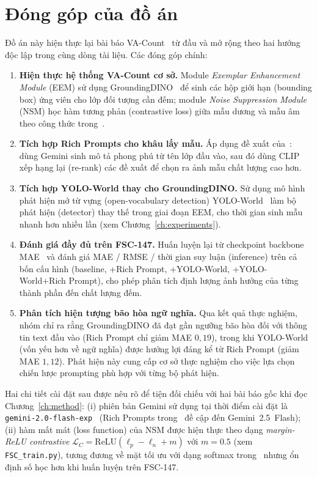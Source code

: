 \documentclass[a4paper,12pt]{report}
\numberwithin{figure}{chapter}
\numberwithin{table}{chapter}
\begin{document}
\section{Đóng góp của đồ án}
Đồ án này hiện thực lại bài báo VA-Count~\cite{vacount} từ đầu và mở rộng theo hai hướng độc lập trong cùng dòng tài liệu. Các đóng góp chính:

\begin{enumerate}
    \item \textbf{Hiện thực hệ thống VA-Count cơ sở.} Module \emph{Exemplar Enhancement Module} (EEM) sử dụng GroundingDINO~\cite{groundingdino} để sinh các hộp giới hạn (bounding box) ứng viên cho lớp đối tượng cần đếm; module \emph{Noise Suppression Module} (NSM) học hàm tương phản (contrastive loss) giữa mẫu dương và mẫu âm theo công thức trong~\cite{vacount}.
    \item \textbf{Tích hợp Rich Prompts cho khâu lấy mẫu.} Áp dụng đề xuất của~\cite{richprompts}: dùng Gemini sinh mô tả phong phú từ tên lớp đầu vào, sau đó dùng CLIP~\cite{clip} xếp hạng lại (re-rank) các đề xuất để chọn ra ảnh mẫu chất lượng cao hơn.
    \item \textbf{Tích hợp YOLO-World thay cho GroundingDINO.} Sử dụng mô hình phát hiện mở từ vựng (open-vocabulary detection) YOLO-World~\cite{yoloworld} làm bộ phát hiện (detector) thay thế trong giai đoạn EEM, cho thời gian sinh mẫu nhanh hơn nhiều lần (xem Chương~\ref{ch:experiments}).
    \item \textbf{Đánh giá đầy đủ trên FSC-147.} Huấn luyện lại từ checkpoint backbone MAE~\cite{mae} và đánh giá MAE / RMSE / thời gian suy luận (inference) trên cả bốn cấu hình (baseline, +Rich Prompt, +YOLO-World, +YOLO-World+Rich Prompt), cho phép phân tích định lượng ảnh hưởng của từng thành phần đến chất lượng đếm.
    \item \textbf{Phân tích hiện tượng bão hòa ngữ nghĩa.} Qua kết quả thực nghiệm, nhóm chỉ ra rằng GroundingDINO đã đạt gần ngưỡng bão hòa đối với thông tin text đầu vào (Rich Prompt chỉ giảm MAE $0{,}19$), trong khi YOLO-World (vốn yếu hơn về ngữ nghĩa) được hưởng lợi đáng kể từ Rich Prompt (giảm MAE $1{,}12$). Phát hiện này cung cấp cơ sở thực nghiệm cho việc lựa chọn chiến lược prompting phù hợp với từng bộ phát hiện.
\end{enumerate}
Hai chi tiết cài đặt sau được nêu rõ để tiện đối chiếu với hai bài báo gốc khi đọc Chương~\ref{ch:method}: (i) phiên bản Gemini sử dụng tại thời điểm cài đặt là \texttt{gemini-2.0-flash-exp}~\cite{gemini} (Rich Prompts trong~\cite{richprompts} đề cập đến Gemini~2.5~Flash); (ii) hàm mất mát (loss function) của NSM được hiện thực theo dạng \emph{margin-ReLU contrastive} $\mathcal{L}_{C}=\mathrm{ReLU}(\ell_p-\ell_n+m)$ với $m{=}0{.}5$ (xem \texttt{FSC\_train.py}), tương đương về mặt tối ưu với dạng softmax trong~\cite{vacount} nhưng ổn định số học hơn khi huấn luyện trên FSC-147.
\end{document}
